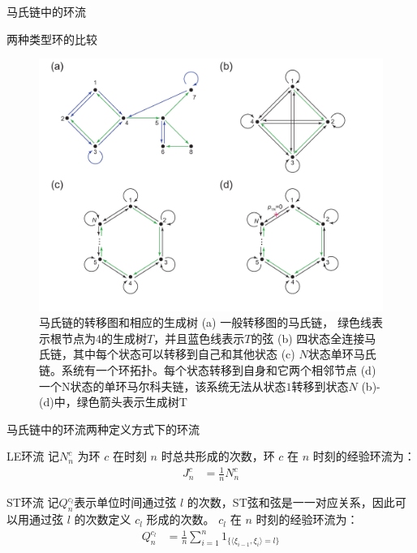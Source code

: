 \documentclass{beamer}
\begin{document}
\begin{frame}{马氏链中的环流}
	\begin{block}{两种类型环的比较}
		\begin{figure}[h]
			\centering
			\includegraphics[scale=0.3]{chart/transitiongraph.pdf}
			\caption{{\tiny 马氏链的转移图和相应的生成树 (a) 一般转移图的马氏链， 绿色线表示根节点为4的生成树$T$，并且蓝色线表示$T$的弦 (b) 四状态全连接马氏链，其中每个状态可以转移到自己和其他状态 (c) $N$状态单环马氏链。系统有一个环拓扑。每个状态转移到自身和它两个相邻节点 (d) 一个N状态的单环马尔科夫链，该系统无法从状态$1$转移到状态$N$ (b)-(d)中，绿色箭头表示生成树T}}
			\label{figure:transitiongraph}
		\end{figure}
	\end{block}
\end{frame}

\begin{frame}{马氏链中的环流}{两种定义方式下的环流}
	\begin{block}{LE环流}
		记$N^c_n$ 为环 $c$ 在时刻 $n$ 时总共形成的次数，环 $c$ 在 $n$ 时刻的经验环流为：
		\begin{align*}
			J_n^c & = \frac{1}{n}N^c_n
		\end{align*}
	\end{block}
	\begin{block}{ST环流}
		记$Q^{c_l}_n$表示单位时间通过弦 $l$ 的次数，ST弦和弦是一一对应关系，因此可以用通过弦 $l$ 的次数定义 $c_l$ 形成的次数。 $c_l$ 在 $n$ 时刻的经验环流为：
		\begin{align*}
			Q^{c_l}_n & = \frac{1}{n}\sum_{i=1}^n1_{\{\langle\xi_{i-1},\xi_i\rangle=l\}}
		\end{align*}
	\end{block}
\end{frame}
\end{document}
